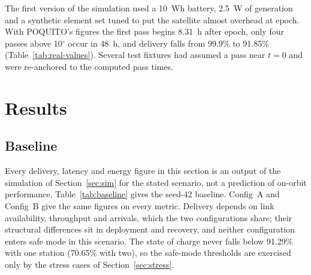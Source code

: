 \documentclass[preprint,12pt]{elsarticle}
\newcommand{\cfgA}{Config~A}
\newcommand{\cfgB}{Config~B}
\begin{document}
The first version of the simulation used a 10~Wh battery, 2.5~W of generation and a synthetic element set tuned to put the satellite almost overhead at epoch. With POQUITO's figures the first pass begins 8.31~h after epoch, only four passes above 10$^\circ$ occur in 48~h, and delivery falls from 99.9\% to 91.85\% (Table~\ref{tab:real-values}). Several test fixtures had assumed a pass near $t=0$ and were re-anchored to the computed pass times.

\begin{table}[t]
\centering
\small
\caption{Placeholder versus published POQUITO inputs for the reference scenario.}
\label{tab:real-values}
\end{table}

\section{Results}\label{sec:results}

\subsection{Baseline}

Every delivery, latency and energy figure in this section is an output of the simulation of Section~\ref{sec:sim} for the stated scenario, not a prediction of on-orbit performance. Table~\ref{tab:baseline} gives the seed-42 baseline. \cfgA{} and \cfgB{} give the same figures on every metric. Delivery depends on link availability, throughput and arrivals, which the two configurations share; their structural differences sit in deployment and recovery, and neither configuration enters safe mode in this scenario. The state of charge never falls below 91.29\% with one station (70.65\% with two), so the safe-mode thresholds are exercised only by the stress cases of Section~\ref{sec:stress}.
\end{document}
